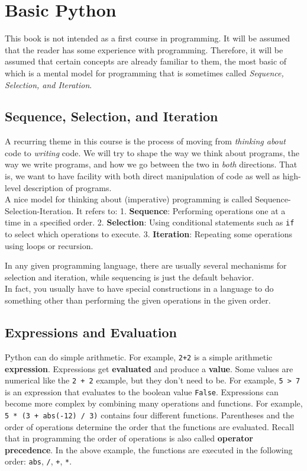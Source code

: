 \chapter{Basic Python}


This book is not intended as a first course in programming.
It will be assumed that the reader has some experience with programming.
Therefore, it will be assumed that certain concepts are already familiar to them, the most basic of which is a mental model for programming that is sometimes called \emph{Sequence, Selection, and Iteration}.

\section{Sequence, Selection, and Iteration}


A recurring theme in this course is the process of moving from \emph{thinking about} code to \emph{writing} code.  We will try to shape the way we think about programs, the way we write programs, and how we go between the two in \emph{both} directions.  That is, we want to have facility with both direct manipulation of code as well as high-level description of programs.\\
A nice model for thinking about (imperative) programming is called Sequence-Selection-Iteration.  It refers to:
1. \textbf{Sequence}: Performing operations one at a time in a specified order.
2. \textbf{Selection}: Using conditional statements such as \texttt{if} to select which operations to execute.
3. \textbf{Iteration}: Repeating some operations using loops or recursion.


In any given programming language, there are usually several mechanisms for selection and iteration, while sequencing is just the default behavior.\\
In fact, you usually have to have special constructions in a language to do something other than performing the given operations in the given order.

\section{Expressions and Evaluation}


Python can do simple arithmetic.  For example, \texttt{2+2} is a simple arithmetic \textbf{expression}.
Expressions get \textbf{evaluated} and produce a \textbf{value}.  Some values are numerical like the \texttt{2 + 2} example, but they don’t need to be.
For example, \texttt{5 > 7} is an expression that evaluates to the boolean value \texttt{False}.
Expressions can become more complex by combining many operations and functions.
For example, \texttt{5 * (3 + abs(-12) / 3)} contains four different functions.  Parentheses and the order of operations determine the order that the functions are evaluated.  Recall that in programming the order of operations is also called \textbf{operator precedence}.  In the above example, the functions are executed in the following order: \texttt{abs}, \texttt{/},  \texttt{+}, \texttt{*}.

